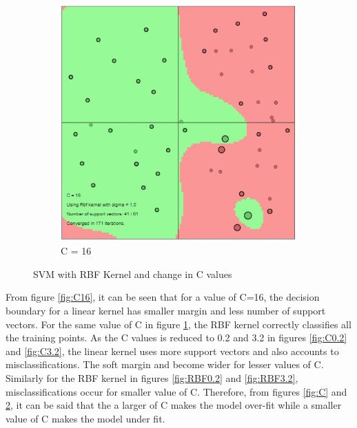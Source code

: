 \documentclass[12pt]{report}
\begin{document}
{\begin{figure}[!ht]
\begin{subfigure}{.32\textwidth}
		\includegraphics[width=.65\linewidth]{RBF_C(16).jpg}
		\caption{C = 16}
		\label{fig:RBF16}
	\end{subfigure}
	\caption{SVM with RBF Kernel and change in C values}
	\label{fig:RBF}
\end{figure}

From figure \ref{fig:C16}, it can be seen that for a value of C=16, the decision boundary for a linear kernel has smaller margin and less number of support vectors. For the same value of C in figure \ref{fig:RBF16}, the RBF kernel correctly classifies all the training points.
As the C values is reduced to 0.2 and 3.2 in figures \ref{fig:C0.2} and \ref{fig:C3.2}, the linear kernel uses more support vectors and also accounts to misclassifications. The soft margin and become wider for lesser values of C. Similarly for the RBF kernel in figures \ref{fig:RBF0.2} and \ref{fig:RBF3.2}, misclassifications occur for smaller value of C. Therefore, from figures \ref{fig:C} and \ref{fig:RBF}, it can be said that the a larger of C makes the model over-fit while a smaller value of C makes the model under fit. 

}
\end{document}
